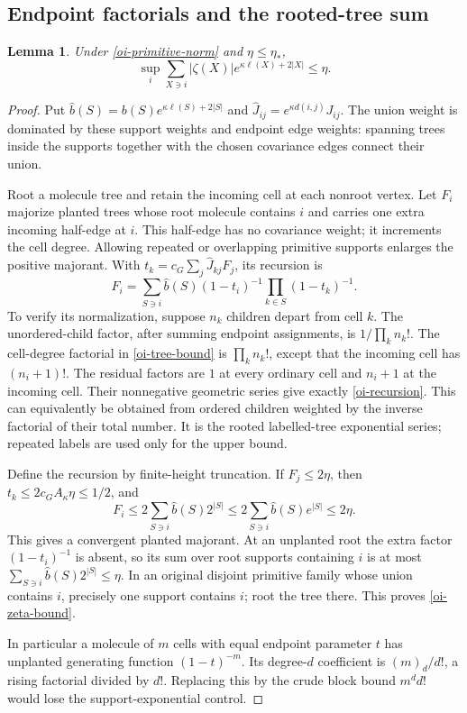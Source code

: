 \documentclass[11pt]{article}
\newtheorem{lemma}[theorem]{Lemma}
\begin{document}
\subsection{Endpoint factorials and the rooted-tree sum}

\begin{lemma}\label{oi-tree-lemma}
Under \eqref{oi-primitive-norm} and $\eta\le\eta_*$,
\begin{equation}\label{oi-zeta-bound}
 \sup_i\sum_{X\ni i}|\zeta(X)|
                  e^{\kappa\ell(X)+2|X|}\le\eta .
\end{equation}
\end{lemma}
\begin{proof}
Put $\widehat b(S)=b(S)e^{\kappa\ell(S)+2|S|}$ and
$\widehat J_{ij}=e^{\kappa d(i,j)}J_{ij}$.
The union weight is dominated by these support weights and endpoint
edge weights: spanning trees inside the supports together with
the chosen covariance edges connect their union.

Root a molecule tree and retain the incoming cell at each nonroot
vertex. Let $F_i$ majorize planted trees whose root molecule
contains $i$ and carries one extra incoming half-edge at $i$.
This half-edge has no covariance weight; it increments the cell
degree. Allowing repeated or overlapping primitive supports
enlarges the positive majorant. With
$t_k=c_G\sum_j\widehat J_{kj}F_j$, its recursion is
\begin{equation}\label{oi-recursion}
 F_i=\sum_{S\ni i}\widehat b(S)
              (1-t_i)^{-1}\prod_{k\in S}(1-t_k)^{-1}.
\end{equation}
To verify its normalization, suppose $n_k$ children depart from
cell $k$. The unordered-child factor, after summing endpoint
assignments, is $1/\prod_k n_k!$. The cell-degree factorial in
\eqref{oi-tree-bound} is $\prod_k n_k!$, except that the incoming
cell has $(n_i+1)!$. The residual factors are $1$ at every
ordinary cell and $n_i+1$ at the incoming cell. Their nonnegative
geometric series give exactly \eqref{oi-recursion}.
This can equivalently be obtained from ordered children weighted
by the inverse factorial of their total number. It is the rooted
labelled-tree exponential series; repeated labels are used only
for the upper bound.

Define the recursion by finite-height truncation. If $F_j\le2\eta$,
then $t_k\le2c_GA_\kappa\eta\le1/2$, and
\[
 F_i\le2\sum_{S\ni i}\widehat b(S)2^{|S|}
      \le2\sum_{S\ni i}\widehat b(S)e^{|S|}
      \le2\eta.
\]
This gives a convergent planted majorant. At an unplanted root
the extra factor $(1-t_i)^{-1}$ is absent, so its sum over root
supports containing $i$ is at most
$\sum_{S\ni i}\widehat b(S)2^{|S|}\le\eta$.
In an original disjoint primitive family whose union contains
$i$, precisely one support contains $i$; root the tree there.
This proves \eqref{oi-zeta-bound}.

In particular a molecule of $m$ cells with equal endpoint parameter
$t$ has unplanted generating function $(1-t)^{-m}$. Its degree-$d$
coefficient is $(m)_d/d!$, a rising factorial divided by $d!$.
Replacing this by the crude block bound $m^d d!$ would lose the
support-exponential control.
\end{proof}
\end{document}
